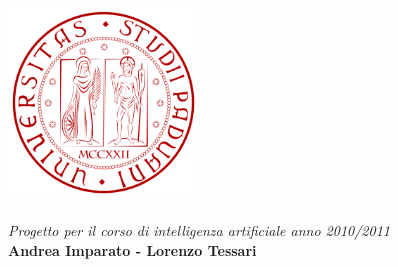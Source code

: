 
\begin{titlepage} %

\begin{center}


	 \includegraphics[height=5cm]{logo_unipd.png}\\[1cm]
	    \huge \textbf{\the\titolo}\\[7cm]


	\large \emph{Progetto per il corso di intelligenza artificiale anno 2010/2011}\\[1cm]
	\normalsize \textbf{Andrea Imparato - Lorenzo Tessari} %




\end{center}
\end{titlepage}

